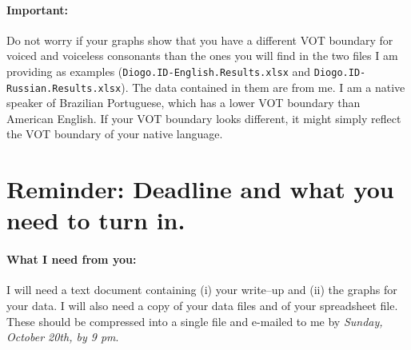 \documentclass{article}
\newcommand{\filefmat}[1]{\texttt{#1}}
\begin{document}
\paragraph{Important:} Do not worry if your graphs show that you have a different VOT boundary for voiced and voiceless consonants than the ones you will find in the two files I am providing as examples (\filefmat{Diogo.ID-English.Results.xlsx} and \filefmat{Diogo.ID-Russian.Results.xlsx}). The data contained in them are from me. I am a native speaker of Brazilian Portuguese, which has a lower VOT boundary than American English. If your VOT boundary looks different, it might simply reflect the VOT boundary of your native language.

\section{Reminder: Deadline and what you need to turn in.}

\paragraph{What I need from you:} I will need a text document containing (i) your write--up and (ii) the graphs for your data. I will also need a copy of your data files and of your spreadsheet file. These should be compressed into a single file and e-mailed to me by \emph{Sunday, October 20th, by 9 pm}.
\end{document}

